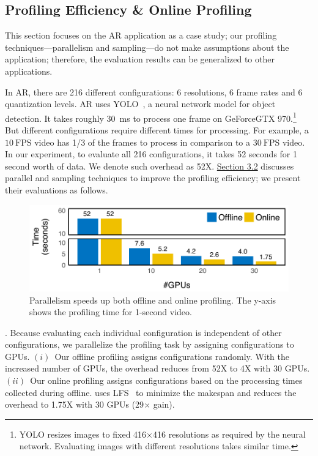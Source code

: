 \subsection{Profiling Efficiency \& Online Profiling}
\label{sec:online-profiling}

This section focuses on the AR application as a case study; our profiling
techniques---parallelism and sampling---do not make assumptions about the
application; therefore, the evaluation results can be generalized to other
applications.

In AR, there are 216 different configurations: 6 resolutions, 6 frame rates and
6 quantization levels. AR uses YOLO~\cite{redmon2016yolo9000}, a neural network
model for object detection. It takes roughly \SI{30}{\ms} to process one frame
on GeForce\textregistered\space GTX 970.\footnote{YOLO resizes images to fixed
  416$\times$416 resolutions as required by the neural network. Evaluating
  images with different resolutions takes similar time.}  But different
configurations require different times for processing. For example, a
\(10~\text{FPS}\) video has 1/3 of the frames to process in comparison to a
\(30~\text{FPS}\) video.  In our experiment, to evaluate all 216 configurations,
it takes 52 seconds for 1 second worth of data. We denote such overhead as
52X\@. \hyperref[sec:automatic-profiling]{Section 3.2} discusses parallel and
sampling techniques to improve the profiling efficiency; we present their
evaluations as follows.

\begin{figure}
  \centering
  \includegraphics[width=1.0\columnwidth]{figures/parallel.pdf}
  \vspace{-1em}
  \caption{Parallelism speeds up both offline and online profiling.  The y-axis
    shows the profiling time for 1-second video.}
  \label{fig:parallel}
  \vspace{-0.5em}
\end{figure}

. Because
evaluating each individual configuration is independent of other configurations,
we parallelize the profiling task by assigning configurations to GPUs.
$(i)$~Our offline profiling assigns configurations randomly.  With the increased
number of GPUs, the overhead reduces from 52X to 4X with 30 GPUs.  $(ii)$~Our
online profiling assigns configurations based on the processing times collected
during offline.  \sysname{} uses LFS~\cite{karger2010scheduling} to minimize the
makespan and reduces the overhead to 1.75X with 30 GPUs (29$\times$ gain).

